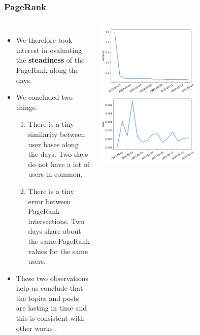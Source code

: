 \documentclass[aspectratio=169]{beamer}
\begin{document}
\begin{frame}[t]
    \frametitle{PageRank}
    \begin{columns}
        \begin{itemize}
            \item We therefore took interest in evaluating the \textbf{steadiness} of the PageRank along the days.
            \item We concluded two things.
                \begin{enumerate}
                    \item There is a tiny similarity between user bases along the days. Two days do not have a lot of users in common. 
                    \item There is a tiny error between PageRank intersections. Two days share about the same PageRank values for the same users.
                \end{enumerate}
            \item These two observations help us conclude that the topics and posts are lasting in time and this is consistent with other works \cite{glenskiCharacterizingSpeedScale2019, liMultiwindowBitcoinPrice2021}.
        \end{itemize}
        \includegraphics[width=0.6\textwidth]{figures/sim_days.pdf}
        \includegraphics[width=0.6\textwidth]{figures/error_days.pdf}
    \end{columns}
\end{frame}
\end{document}
